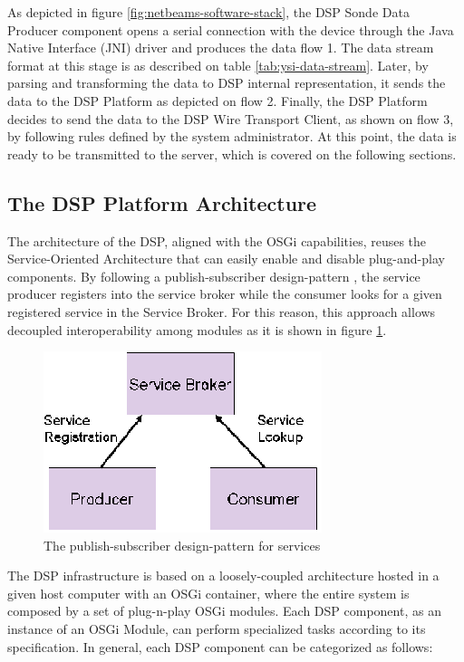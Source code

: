 As depicted in figure \ref{fig:netbeams-software-stack}, the DSP Sonde Data
Producer component opens a serial connection with the device through the Java
Native Interface (JNI) driver and produces the data flow 1. The data stream
format at this stage is as described on table \ref{tab:ysi-data-stream}.
Later, by parsing and transforming the data to DSP internal representation, it
sends the data to the DSP Platform as depicted on flow 2. Finally, the DSP
Platform decides to send the data to the DSP Wire Transport Client, as shown
on flow 3, by following rules defined by the system administrator. At this
point, the data is ready to be transmitted to the server, which is covered on
the following sections.

\subsection{The DSP Platform Architecture}

The architecture of the DSP, aligned with the OSGi capabilities, reuses the
Service-Oriented Architecture that can easily enable and disable plug-and-play
components. By following a publish-subscriber design-pattern \cite{gof}, the
service producer registers into the service broker while the consumer looks
for a given registered service in the Service Broker. For this reason, this
approach allows decoupled interoperability among modules as it is shown in
figure \ref{fig:publish-subscriber-pattern}.

\begin{figure}[h]
  \centering
  \includegraphics[scale=0.6]{../diagrams/publish-subscriber-pattern}
  \caption{The publish-subscriber design-pattern for services}
  \label{fig:publish-subscriber-pattern}
\end{figure}

The DSP infrastructure is based on a loosely-coupled architecture hosted in a
given host computer with an OSGi container, where the entire system is
composed by a set of plug-n-play OSGi modules. Each DSP component, as an
instance of an OSGi Module, can perform specialized tasks according to its
specification. In general, each DSP component can be categorized as follows:

